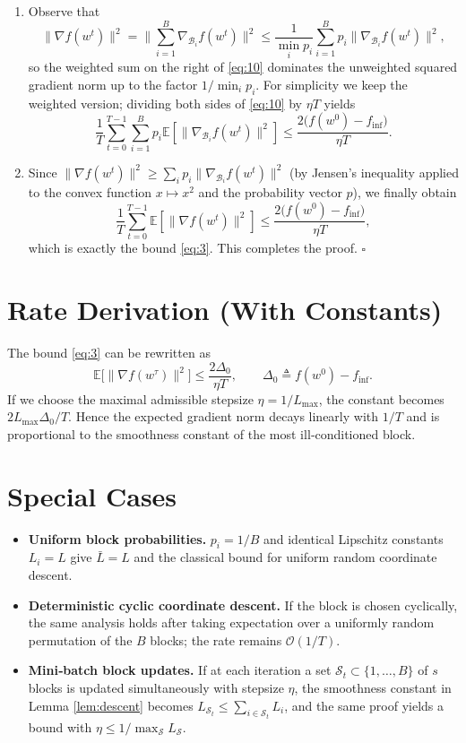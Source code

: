 \documentclass{article}
\newcommand{\E}{\mathbb{E}}
\begin{document}
\begin{enumerate}
\begin{align}
\tag{10}
\end{align}
\item[Step 7.]  Observe that
\[
\|\nabla f(w^{t})\|^{2}
   =\Big\|\sum_{i=1}^{B}\nabla_{\mathcal{B}_{i}}f(w^{t})\Big\|^{2}
   \le \frac{1}{\min_{i}p_{i}}
        \sum_{i=1}^{B}p_{i}\|\nabla_{\mathcal{B}_{i}}f(w^{t})\|^{2},
\]
so the weighted sum on the right of \eqref{eq:10} dominates the
unweighted squared gradient norm up to the factor $1/\min_{i}p_{i}$.
For simplicity we keep the weighted version; dividing both sides of
\eqref{eq:10} by $\eta T$ yields
\[
\frac{1}{T}\sum_{t=0}^{T-1}
   \sum_{i=1}^{B}p_{i}\E\!\left[\|\nabla_{\mathcal{B}_{i}}f(w^{t})\|^{2}\right]
\le \frac{2\bigl(f(w^{0})-f_{\inf}\bigr)}{\eta T}.
\tag{11}
\]
\item[Step 8.]  Since $\|\nabla f(w^{t})\|^{2}\ge
\sum_{i}p_{i}\|\nabla_{\mathcal{B}_{i}}f(w^{t})\|^{2}$ (by Jensen’s inequality
applied to the convex function $x\mapsto x^{2}$ and the probability
vector $p$), we finally obtain
\[
\frac{1}{T}\sum_{t=0}^{T-1}\E\!\left[\|\nabla f(w^{t})\|^{2}\right]
\le \frac{2\bigl(f(w^{0})-f_{\inf}\bigr)}{\eta T},
\]
which is exactly the bound \eqref{eq:3}.  This completes the proof.
\hfill $\square$
\end{enumerate}

\section*{Rate Derivation (With Constants)}
The bound \eqref{eq:3} can be rewritten as
\[
\mathbb{E}\bigl[\|\nabla f(w^{\tau})\|^{2}\bigr]
\le
\frac{2\Delta_{0}}{\eta T},
\qquad
\Delta_{0}\triangleq f(w^{0})-f_{\inf}.
\]
If we choose the maximal admissible stepsize $\eta = 1/L_{\max}$,
the constant becomes $2L_{\max}\Delta_{0}/T$.  Hence the
expected gradient norm decays linearly with $1/T$ and is proportional
to the smoothness constant of the most ill‑conditioned block.

\section*{Special Cases}
\begin{itemize}
\item \textbf{Uniform block probabilities.} $p_{i}=1/B$ and identical
Lipschitz constants $L_{i}=L$ give $\bar L = L$ and the classical bound
for uniform random coordinate descent.
\item \textbf{Deterministic cyclic coordinate descent.}
If the block is chosen cyclically, the same analysis holds after
taking expectation over a uniformly random permutation of the $B$
blocks; the rate remains $\mathcal{O}(1/T)$.
\item \textbf{Mini‑batch block updates.}
If at each iteration a set $\mathcal{S}_{t}\subset\{1,\dots ,B\}$
of $s$ blocks is updated simultaneously with stepsize $\eta$, the
smoothness constant in Lemma \ref{lem:descent} becomes
$L_{\mathcal{S}_{t}}\le \sum_{i\in\mathcal{S}_{t}}L_{i}$, and the same proof
yields a bound with $\eta\le 1/\max_{\mathcal{S}}L_{\mathcal{S}}$.
\end{itemize}
\end{document}
